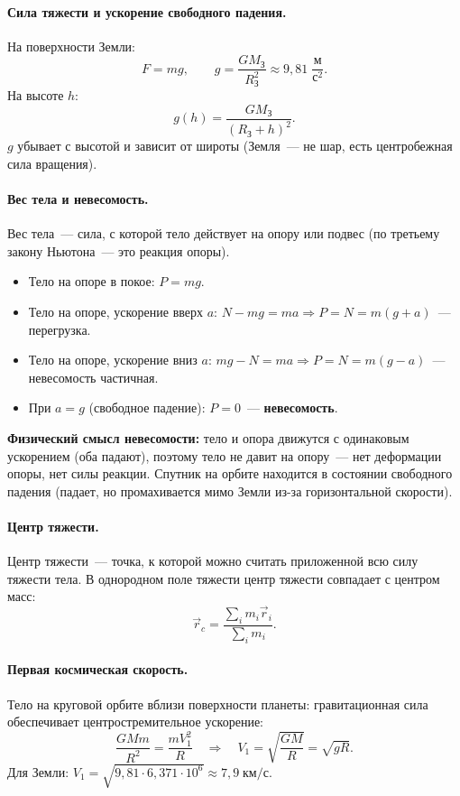 \documentclass[12pt]{article}
\begin{document}
\paragraph{Сила тяжести и ускорение свободного падения.}
На поверхности Земли:
\[
	F = mg, \qquad g = \frac{GM_{\text{З}}}{R_{\text{З}}^2} \approx 9{,}81 \; \frac{\text{м}}{\text{с}^2}.
\]
На высоте $h$:
\[
	g(h) = \frac{GM_{\text{З}}}{(R_{\text{З}} + h)^2}.
\]
$g$ убывает с высотой и зависит от широты (Земля~--- не шар, есть центробежная сила вращения).

\paragraph{Вес тела и невесомость.}
\begin{definition}
	Вес тела~--- сила, с которой тело действует на опору или подвес (по третьему закону Ньютона~--- это реакция опоры).
\end{definition}

\begin{itemize}
	\item Тело на опоре в покое: $P = mg$.
	\item Тело на опоре, ускорение вверх $a$: $N - mg = ma \Rightarrow P = N = m(g + a)$~--- перегрузка.
	\item Тело на опоре, ускорение вниз $a$: $mg - N = ma \Rightarrow P = N = m(g - a)$~--- невесомость частичная.
	\item При $a = g$ (свободное падение): $P = 0$~--- \textbf{невесомость}.
\end{itemize}

\textbf{Физический смысл невесомости:} тело и опора движутся с одинаковым ускорением (оба падают), поэтому тело не давит на опору~--- нет деформации опоры, нет силы реакции. Спутник на орбите находится в состоянии свободного падения (падает, но промахивается мимо Земли из-за горизонтальной скорости).

\paragraph{Центр тяжести.}
Центр тяжести~--- точка, к которой можно считать приложенной всю силу тяжести тела. В однородном поле тяжести центр тяжести совпадает с центром масс:
\[
	\vec{r}_c = \frac{\sum_i m_i \vec{r}_i}{\sum_i m_i}.
\]

\paragraph{Первая космическая скорость.}
Тело на круговой орбите вблизи поверхности планеты: гравитационная сила обеспечивает центростремительное ускорение:
\[
	\frac{GMm}{R^2} = \frac{mV_1^2}{R} \quad \Longrightarrow \quad V_1 = \sqrt{\frac{GM}{R}} = \sqrt{gR}.
\]
Для Земли: $V_1 = \sqrt{9{,}81 \cdot 6{,}371 \cdot 10^6} \approx 7{,}9 \; \text{км/с}$.
\end{document}
